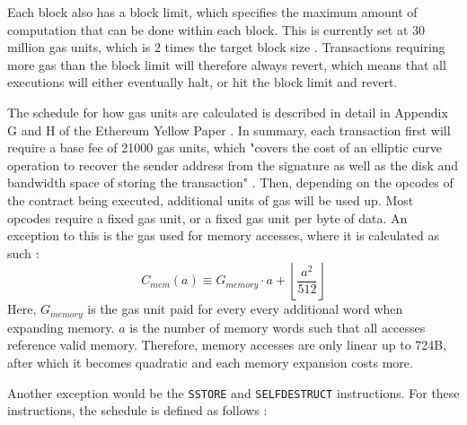 Each block also has a block limit, which specifies the maximum amount of computation
that can be done within each block. This is currently set at 30 million gas units,
which is 2 times the target block size \cite{ethgas}. Transactions requiring more 
gas than the block limit will therefore always revert, which means that all executions
will either eventually halt, or hit the block limit and revert.


The schedule for how gas units are calculated is described in detail in Appendix G and H of
the Ethereum Yellow Paper \cite{ethereumyellowpaper}. In summary, each transaction first will require
a base fee of 21000 gas units, which "covers the cost of an elliptic curve operation to recover the 
sender address from the signature as well as the disk and bandwidth space of storing the transaction" 
\cite{ethdesignrationale}. Then, depending on the opcodes of the contract being executed, additional
units of gas will be used up. Most opcodes require a fixed gas unit, or a fixed gas unit per byte of data.
An exception to this is the gas used for memory accesses, where it is calculated as such \cite{ethereumyellowpaper}:
\[ C_{mem}(a) \equiv G_{memory} \cdot a + \left \lfloor{\frac{a^2}{512}}\right \rfloor \]
Here, $G_{memory}$ is the gas unit paid for every every additional word when expanding memory.
$a$ is the number of memory words such that all accesses reference valid memory. Therefore,
memory accesses are only linear up to 724B, after which it becomes quadratic and each memory
expansion costs more.

Another exception would be the \texttt{SSTORE} and \texttt{SELFDESTRUCT} instructions. For
these instructions, the schedule is defined as follows \cite{ethereumyellowpaper}:

